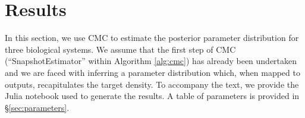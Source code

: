 \section{Results}\label{sec:results}
In this section, we use CMC to estimate the posterior parameter distribution for three biological systems.
We assume that the first step of CMC (``SnapshotEstimator'' within Algorithm \ref{alg:cmc}) has already been undertaken and we are faced with inferring a parameter distribution which, when mapped to outputs, recapitulates the target density. To accompany the text, we provide the Julia notebook used to generate the results. %
A table of parameters is provided in \S \ref{sec:parameters}.


